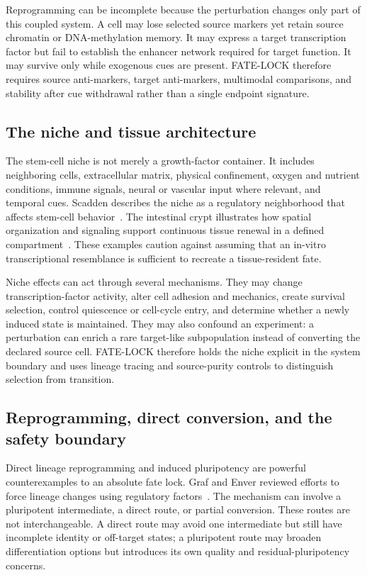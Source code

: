 \documentclass[10pt,conference]{IEEEtran}
\begin{document}
Reprogramming can be incomplete because the perturbation changes only part of this coupled system. A cell may lose selected source markers yet retain source chromatin or DNA-methylation memory. It may express a target transcription factor but fail to establish the enhancer network required for target function. It may survive only while exogenous cues are present. FATE-LOCK therefore requires source anti-markers, target anti-markers, multimodal comparisons, and stability after cue withdrawal rather than a single endpoint signature.

\subsection{The niche and tissue architecture}

The stem-cell niche is not merely a growth-factor container. It includes neighboring cells, extracellular matrix, physical confinement, oxygen and nutrient conditions, immune signals, neural or vascular input where relevant, and temporal cues. Scadden describes the niche as a regulatory neighborhood that affects stem-cell behavior~\cite{scadden2014}. The intestinal crypt illustrates how spatial organization and signaling support continuous tissue renewal in a defined compartment~\cite{clevers2013}. These examples caution against assuming that an in-vitro transcriptional resemblance is sufficient to recreate a tissue-resident fate.

Niche effects can act through several mechanisms. They may change transcription-factor activity, alter cell adhesion and mechanics, create survival selection, control quiescence or cell-cycle entry, and determine whether a newly induced state is maintained. They may also confound an experiment: a perturbation can enrich a rare target-like subpopulation instead of converting the declared source cell. FATE-LOCK therefore holds the niche explicit in the system boundary and uses lineage tracing and source-purity controls to distinguish selection from transition.

\subsection{Reprogramming, direct conversion, and the safety boundary}

Direct lineage reprogramming and induced pluripotency are powerful counterexamples to an absolute fate lock. Graf and Enver reviewed efforts to force lineage changes using regulatory factors~\cite{graf2009}. The mechanism can involve a pluripotent intermediate, a direct route, or partial conversion. These routes are not interchangeable. A direct route may avoid one intermediate but still have incomplete identity or off-target states; a pluripotent route may broaden differentiation options but introduces its own quality and residual-pluripotency concerns.
\end{document}
